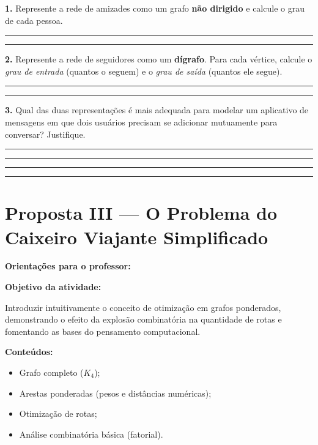 \documentclass[
  12pt,
  oneside,
  a4paper,
  english,
  brazilian
  ]{abntex2}
\theoremstyle{definition}
\def\vspace#1{ }%
\begin{document}
\begin{apendicesenv}
\textbf{1.} Represente a rede de amizades como um grafo \textbf{não dirigido} e calcule o grau de cada pessoa.

\vspace{5cm}
\noindent\rule{\textwidth}{0.4pt}\vspace{0.3cm}
\noindent\rule{\textwidth}{0.4pt}

\vspace{0.5cm}
\textbf{2.} Represente a rede de seguidores como um \textbf{dígrafo}. Para cada vértice, calcule o \emph{grau de entrada} (quantos o seguem) e o \emph{grau de saída} (quantos ele segue).

\vspace{6cm}
\noindent\rule{\textwidth}{0.4pt}\vspace{0.3cm}
\noindent\rule{\textwidth}{0.4pt}

\vspace{0.5cm}
\textbf{3.} Qual das duas representações é mais adequada para modelar um aplicativo de mensagens em que dois usuários precisam se adicionar mutuamente para conversar? Justifique.

\vspace{0.3cm}
\noindent\rule{\textwidth}{0.4pt}\vspace{0.3cm}
\noindent\rule{\textwidth}{0.4pt}\vspace{0.3cm}
\noindent\rule{\textwidth}{0.4pt}\vspace{0.3cm}
\noindent\rule{\textwidth}{0.4pt}


\chapter{Proposta III --- O Problema do Caixeiro Viajante Simplificado}
\label{apendice:caixeiro}

\textbf{Orientações para o professor:}

\textbf{Objetivo da atividade:}

Introduzir intuitivamente o conceito de otimização em grafos ponderados, demonstrando o efeito da explosão combinatória na quantidade de rotas e fomentando as bases do pensamento computacional.

\textbf{Conteúdos:}

\begin{itemize}[noitemsep]
  \item Grafo completo ($K_4$);
  \item Arestas ponderadas (pesos e distâncias numéricas);
  \item Otimização de rotas;
  \item Análise combinatória básica (fatorial).
\end{itemize}


\end{apendicesenv}
\end{document}
